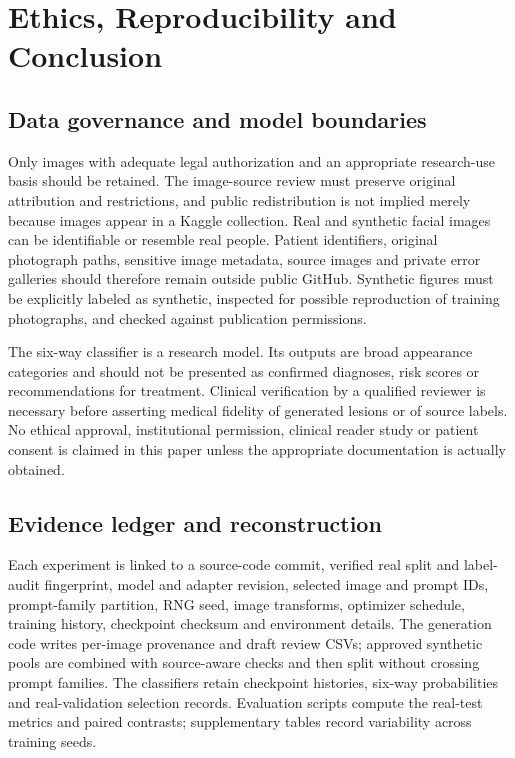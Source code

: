 \section{Ethics, Reproducibility and Conclusion}
\subsection{Data governance and model boundaries}
Only images with adequate legal authorization and an appropriate research-use basis should be retained. The image-source review must preserve original attribution and restrictions, and public redistribution is not implied merely because images appear in a Kaggle collection. Real and synthetic facial images can be identifiable or resemble real people. Patient identifiers, original photograph paths, sensitive image metadata, source images and private error galleries should therefore remain outside public GitHub. Synthetic figures must be explicitly labeled as synthetic, inspected for possible reproduction of training photographs, and checked against publication permissions.

The six-way classifier is a research model. Its outputs are broad appearance categories and should not be presented as confirmed diagnoses, risk scores or recommendations for treatment. Clinical verification by a qualified reviewer is necessary before asserting medical fidelity of generated lesions or of source labels. No ethical approval, institutional permission, clinical reader study or patient consent is claimed in this paper unless the appropriate documentation is actually obtained.

\subsection{Evidence ledger and reconstruction}
Each experiment is linked to a source-code commit, verified real split and label-audit fingerprint, model and adapter revision, selected image and prompt IDs, prompt-family partition, RNG seed, image transforms, optimizer schedule, training history, checkpoint checksum and environment details. The generation code writes per-image provenance and draft review CSVs; approved synthetic pools are combined with source-aware checks and then split without crossing prompt families. The classifiers retain checkpoint histories, six-way probabilities and real-validation selection records. Evaluation scripts compute the real-test metrics and paired contrasts; supplementary tables record variability across training seeds.


